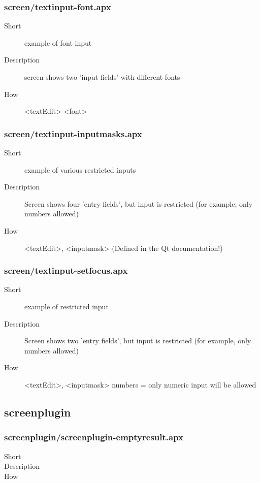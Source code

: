 \subsubsection{screen/textinput-font.apx}
\begin{description}
\item[Short] 
 example of font input
\item[Description] 
 screen shows two 'input fields' with different fonts
\item[How] 
 \textless{}textEdit\textgreater{} \textless{}font\textgreater{}
\end{description}

\subsubsection{screen/textinput-inputmasks.apx}
\begin{description}
\item[Short] 
 example of various restricted inputs
\item[Description] 
 Screen shows four 'entry fields', but input is restricted (for example, only numbers allowed)
\item[How] 
 \textless{}textEdit\textgreater{}, \textless{}inputmask\textgreater{} (Defined in the Qt documentation!)
\end{description}

\subsubsection{screen/textinput-setfocus.apx}
\begin{description}
\item[Short] 
 example of restricted input
\item[Description] 
 Screen shows two 'entry fields', but input is restricted (for example, only numbers allowed)
\item[How] 
 \textless{}textEdit\textgreater{}, \textless{}inputmask\textgreater{} numbers = only numeric input will be allowed
\end{description}

\subsection{screenplugin}
\subsubsection{screenplugin/screenplugin-emptyresult.apx}
\begin{description}
\item[Short] 
\item[Description] 
\item[How] 
\end{description}

